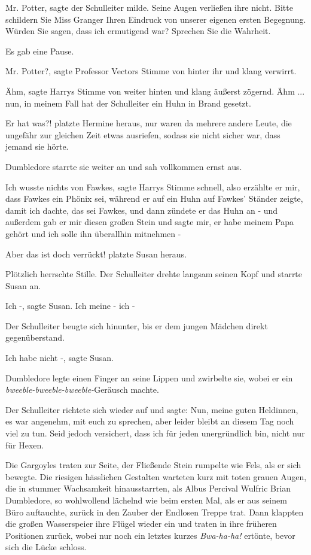 \glqq{}Mr. Potter\grqq{}, sagte der Schulleiter milde. Seine Augen verließen ihre
nicht. \glqq{}Bitte schildern Sie Miss Granger Ihren Eindruck von unserer eigenen
ersten Begegnung. Würden Sie sagen, dass ich ermutigend war? Sprechen Sie die
Wahrheit.\grqq{}

Es gab eine Pause.

\glqq{}Mr. Potter?\grqq{}, sagte Professor Vectors Stimme von hinter ihr und
klang verwirrt.

\glqq{}Ähm\grqq{}, sagte Harrys Stimme von weiter hinten und klang äußerst
zögernd. \glqq{}Ähm ... nun, in meinem Fall hat der Schulleiter ein Huhn in Brand
gesetzt.\grqq{}

\glqq{}Er hat was?!\grqq{} platzte Hermine heraus, nur waren da mehrere andere
Leute, die ungefähr zur gleichen Zeit etwas ausriefen, sodass sie nicht sicher
war, dass jemand sie hörte.

Dumbledore starrte sie weiter an und sah vollkommen ernst aus.

\glqq{}Ich wusste nichts von Fawkes\grqq{}, sagte Harrys Stimme schnell, \glqq{}
also erzählte er mir, dass Fawkes ein Phönix sei, während er auf ein Huhn auf
Fawkes' Ständer zeigte, damit ich dachte, das sei Fawkes, und dann zündete er
das Huhn an - und außerdem gab er mir diesen großen Stein und sagte mir, er habe
meinem Papa gehört und ich solle ihn überallhin mitnehmen -\grqq{}

\glqq{}Aber das ist doch verrückt!\grqq{} platzte Susan heraus.

Plötzlich herrschte Stille. Der Schulleiter drehte langsam seinen Kopf und
starrte Susan an.

\glqq{}Ich -\grqq{}, sagte Susan. \glqq{}Ich meine - ich -\grqq{}

Der Schulleiter beugte sich hinunter, bis er dem jungen Mädchen direkt
gegenüberstand.

\glqq{}Ich habe nicht -\grqq{}, sagte Susan.

Dumbledore legte einen Finger an seine Lippen und zwirbelte sie, wobei er ein
\emph{bweeble-bweeble-bweeble-}Geräusch machte.

Der Schulleiter richtete sich wieder auf und sagte: \glqq{}Nun, meine guten
Heldinnen, es war angenehm, mit euch zu sprechen, aber leider bleibt an diesem
Tag noch viel zu tun. Seid jedoch versichert, dass ich für jeden unergründlich
bin, nicht nur für Hexen.\grqq{}

Die Gargoyles traten zur Seite, der Fließende Stein rumpelte wie Fels, als er
sich bewegte. Die riesigen hässlichen Gestalten warteten kurz mit toten grauen
Augen, die in stummer Wachsamkeit hinausstarrten, als Albus Percival Wulfric
Brian Dumbledore, so wohlwollend lächelnd wie beim ersten Mal, als er aus seinem
Büro auftauchte, zurück in den Zauber der Endlosen Treppe trat. Dann klappten
die großen Wasserspeier ihre Flügel wieder ein und traten in ihre früheren
Positionen zurück, wobei nur noch ein letztes kurzes \glqq{}
\emph{Bwa-ha-ha!}\grqq{} ertönte, bevor sich die Lücke schloss.


